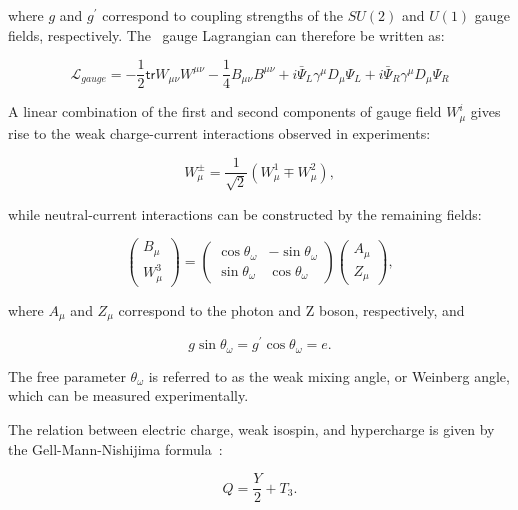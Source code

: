 where $g$ and $g^{\prime}$ correspond to coupling strengths of the $SU(2)$ and $U(1)$ gauge fields, respectively. The \ew~gauge Lagrangian can therefore be written as:

\begin{equation}
\label{eq:LagGauge}
\mathcal{L}_{gauge}=-\frac{1}{2}\textsf{tr}W_{\mu\nu}W^{\mu\nu}-\frac{1}{4}B_{\mu\nu}B^{\mu\nu}+i\bar{\Psi}_{L}\gamma^{\mu}D_{\mu}\Psi_{L}+i\bar{\Psi}_{R}\gamma^{\mu}D_{\mu}\Psi_{R}
\end{equation}

A linear combination of the first and second components of gauge field $W_{\mu}^{i}$ gives rise to the weak charge-current interactions observed in experiments:

\begin{equation}
\label{eq:CC}
W^{\pm}_{\mu}=\frac{1}{\sqrt{2}}(W^{1}_{\mu}\mp W^{2}_{\mu}),
\end{equation}

while neutral-current interactions can be constructed by the remaining fields:

\begin{equation}
\label{eq:NC}
\begin{pmatrix}B_{\mu}\\W_{\mu}^{3}\end{pmatrix}=\begin{pmatrix}\cos\theta_{\omega}&-\sin\theta_{\omega}\\\sin\theta_{\omega}&\cos\theta_{\omega}\end{pmatrix}\begin{pmatrix}A_{\mu}\\Z_{\mu}\end{pmatrix},
\end{equation}

where $A_{\mu}$ and $Z_{\mu}$ correspond to the photon and Z boson, respectively, and 

\begin{equation}
\label{eq:MixAngle}
g\sin\theta_{\omega}=g^{\prime}\cos\theta_{\omega}=e.
\end{equation}

The free parameter $\theta_{\omega}$ is referred to as the weak mixing angle, or Weinberg angle, which can be measured experimentally.

The relation between electric charge, weak isospin, and hypercharge is given by the Gell-Mann-Nishijima formula~\cite{Nakano:1953zz,Gell-Mann:1956iqa}:

\begin{equation}
Q=\frac{Y}{2}+T_{3}.
\end{equation}

